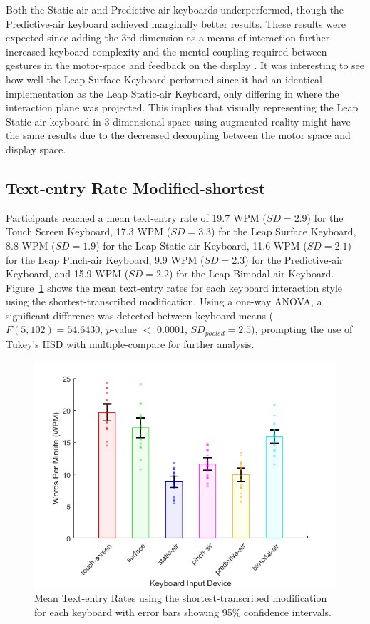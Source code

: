 Both the Static-air and Predictive-air keyboards underperformed, though the Predictive-air keyboard achieved marginally better results. These results were expected since adding the 3rd-dimension as a means of interaction further increased keyboard complexity and the mental coupling required between gestures in the motor-space and feedback on the display \cite{ref_vulture,ref_stimulus_response_compatibility}. It was interesting to see how well the Leap Surface Keyboard performed since it had an identical implementation as the Leap Static-air Keyboard, only differing in where the interaction plane was projected. This implies that visually representing the Leap Static-air keyboard in 3-dimensional space using augmented reality might have the same results due to the decreased decoupling between the motor space and display space.

\subsection{Text-entry Rate Modified-shortest}
Participants reached a mean text-entry rate of 19.7 WPM ($SD = 2.9$) for the Touch Screen Keyboard, 17.3 WPM ($SD = 3.3$) for the Leap Surface Keyboard, 8.8 WPM ($SD = 1.9$) for the Leap Static-air Keyboard, 11.6 WPM ($SD = 2.1$) for the Leap Pinch-air Keyboard, 9.9 WPM ($SD = 2.3$) for the Predictive-air Keyboard, and 15.9 WPM ($SD = 2.2$) for the Leap Bimodal-air Keyboard. Figure~\ref{fig_textentry_short_mean} shows the mean text-entry rates for each keyboard interaction style using the shortest-transcribed modification. Using a one-way ANOVA, a significant difference was detected between keyboard means ($F(5, 102) = 54.6430$, $p$-value $<$ 0.0001, $SD_{pooled} = 2.5$), prompting the use of Tukey's HSD with multiple-compare for further analysis.

\begin{figure}[!t]
	\centering
	\includegraphics{Figures/fig_textentry_short_mean}
	\caption[Mean Text-entry Rates for Modified-shortest]{Mean Text-entry Rates using the shortest-transcribed modification for each keyboard with error bars showing 95\% confidence intervals.}
	\label{fig_textentry_short_mean}
\end{figure}

